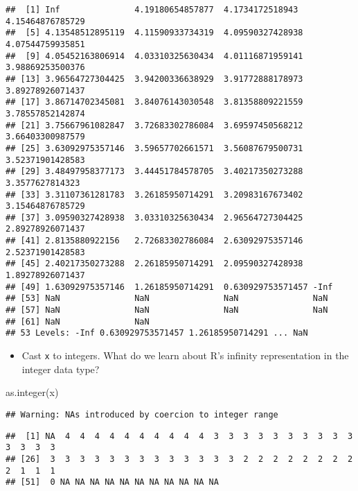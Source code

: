 \documentclass[
]{article}
\newenvironment{Shaded}{\begin{snugshade}}{\end{snugshade}}
\newcommand{\FunctionTok}[1]{\textcolor[rgb]{0.00,0.00,0.00}{#1}}
\newcommand{\NormalTok}[1]{#1}
\providecommand{\tightlist}{%
  \setlength{\itemsep}{0pt}\setlength{\parskip}{0pt}}
\begin{document}
\begin{verbatim}
##  [1] Inf               4.19180654857877  4.1734172518943   4.15464876785729 
##  [5] 4.13548512895119  4.11590933734319  4.09590327428938  4.07544759935851 
##  [9] 4.05452163806914  4.03310325630434  4.01116871959141  3.98869253500376 
## [13] 3.96564727304425  3.94200336638929  3.91772888178973  3.89278926071437 
## [17] 3.86714702345081  3.84076143030548  3.81358809221559  3.78557852142874 
## [21] 3.75667961082847  3.72683302786084  3.69597450568212  3.66403300987579 
## [25] 3.63092975357146  3.59657702661571  3.56087679500731  3.52371901428583 
## [29] 3.48497958377173  3.44451784578705  3.40217350273288  3.3577627814323  
## [33] 3.31107361281783  3.26185950714291  3.20983167673402  3.15464876785729 
## [37] 3.09590327428938  3.03310325630434  2.96564727304425  2.89278926071437 
## [41] 2.8135880922156   2.72683302786084  2.63092975357146  2.52371901428583 
## [45] 2.40217350273288  2.26185950714291  2.09590327428938  1.89278926071437 
## [49] 1.63092975357146  1.26185950714291  0.630929753571457 -Inf             
## [53] NaN               NaN               NaN               NaN              
## [57] NaN               NaN               NaN               NaN              
## [61] NaN               NaN              
## 53 Levels: -Inf 0.630929753571457 1.26185950714291 ... NaN
\end{verbatim}

\begin{itemize}
\tightlist
\item
  Cast \texttt{x} to integers. What do we learn about R's infinity
  representation in the integer data type?
\end{itemize}

\begin{Shaded}
\begin{Highlighting}[]
\FunctionTok{as.integer}\NormalTok{(x)}
\end{Highlighting}
\end{Shaded}

\begin{verbatim}
## Warning: NAs introduced by coercion to integer range
\end{verbatim}

\begin{verbatim}
##  [1] NA  4  4  4  4  4  4  4  4  4  4  3  3  3  3  3  3  3  3  3  3  3  3  3  3
## [26]  3  3  3  3  3  3  3  3  3  3  3  3  3  2  2  2  2  2  2  2  2  2  1  1  1
## [51]  0 NA NA NA NA NA NA NA NA NA NA NA
\end{verbatim}
\end{document}
